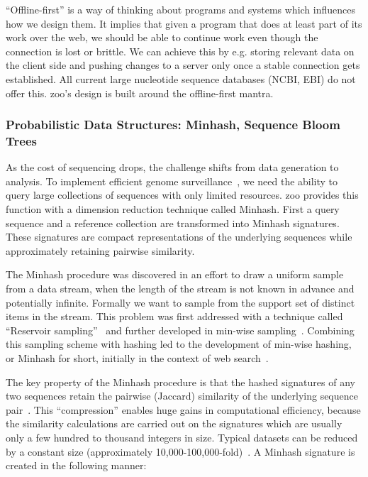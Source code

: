 ``Offline-first'' is a way of thinking about programs and systems which influences how we design them. It implies that given a program that does at least part of its work over the web, we should be able to continue work even though the connection is lost or brittle. We can achieve this by e.g. storing relevant data on the client side and pushing changes to a server only once a stable connection gets established. All current large nucleotide sequence databases (NCBI, EBI) do not offer this. zoo's design is built around the offline-first mantra.


\subsubsection{Probabilistic Data Structures: Minhash, Sequence Bloom Trees}

As the cost of sequencing drops, the challenge shifts from data generation to analysis. To implement efficient genome surveillance~\cite{Schatz2012-ju}, we need the ability to query large collections of sequences with only limited resources. zoo provides this function with a dimension reduction technique called Minhash. First a query sequence and a reference collection are transformed into Minhash signatures. These signatures are compact representations of the underlying sequences while approximately retaining pairwise similarity.

The Minhash procedure was discovered in an effort to draw a uniform sample from a data stream, when the length of the stream is not known in advance and potentially infinite. Formally we want to sample from the support set of distinct items in the stream. This problem was first addressed with a technique called ``Reservoir sampling''~\cite{cormode2007-cp} and further developed in min-wise sampling~\cite{Nath2004-uf}. Combining this sampling scheme with hashing led to the development of min-wise hashing, or Minhash for short, initially in the context of web search~\cite{Broder2000-zj, Broder1997-dr}.

The key property of the Minhash procedure is that the hashed signatures of any two sequences retain the pairwise (Jaccard) similarity of the underlying sequence pair~\cite{Leskovec2014-gb}. This ``compression'' enables huge gains in computational efficiency, because the similarity calculations are carried out on the signatures which are usually only a few hundred to thousand integers in size. Typical datasets can be reduced by a constant size (approximately 10,000-100,000-fold)~\cite{Ondov2016-sl}. A Minhash signature is created in the following manner:


